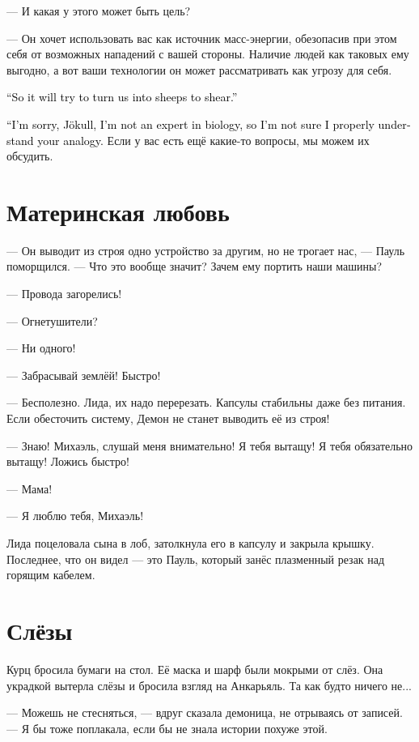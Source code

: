 \documentclass[a4paper,10pt,fleqn]{book}\usepackage{polyglossia}\setdefaultlanguage{english}\setotherlanguage{russian}\defaultfontfeatures{Ligatures=TeX,Mapping=tex-text}\usepackage{xcolor}\definecolor{lightgray}{HTML}{bbbbbb}\color{lightgray}\newcommand{\ml}[3]{\textcolor{black}{#3}}
\newcommand{\asterism}{\vspace{1em}{\centering\Large\bfseries$\ast~\ast~\ast$\par}\vspace{1em}}
\begin{document}
--- И какая у этого может быть цель?

--- Он хочет использовать вас как источник масс-энергии, обезопасив при этом себя от возможных нападений с вашей стороны.
Наличие людей как таковых ему выгодно, а вот ваши технологии он может рассматривать как угрозу для себя.

\ml{$0$}
{--- То есть из нас делают овечек и собираются стричь.}
{``So it will try to turn us into sheeps to shear.''}

\ml{$0$}
{--- Простите, Йокудль, я не специалист в биологии и не вполне понимаю вашу аналогию.}
{``I'm sorry, Jökull, I'm not an expert in biology, so I'm not sure I properly understand your analogy.}
Если у вас есть ещё какие-то вопросы, мы можем их обсудить.

\section{Материнская любовь}

--- Он выводит из строя одно устройство за другим, но не трогает нас, --- Пауль поморщился.
--- Что это вообще значит?
Зачем ему портить наши машины?

\asterism

--- Провода загорелись!

--- Огнетушители?

--- Ни одного!

--- Забрасывай землёй!
Быстро!

--- Бесполезно.
Лида, их надо перерезать.
Капсулы стабильны даже без питания.
Если обесточить систему, Демон не станет выводить её из строя!

--- Знаю!
Михаэль, слушай меня внимательно!
Я тебя вытащу!
Я тебя обязательно вытащу!
Ложись быстро!

--- Мама!

--- Я люблю тебя, Михаэль!

Лида поцеловала сына в лоб, затолкнула его в капсулу и закрыла крышку.
Последнее, что он видел --- это Пауль, который занёс плазменный резак над горящим кабелем.

\section{Слёзы}

Курц бросила бумаги на стол.
Её маска и шарф были мокрыми от слёз.
Она украдкой вытерла слёзы и бросила взгляд на Анкарьяль.
Та как будто ничего не...

--- Можешь не стесняться, --- вдруг сказала демоница, не отрываясь от записей.
--- Я бы тоже поплакала, если бы не знала истории похуже этой.
\end{document}
